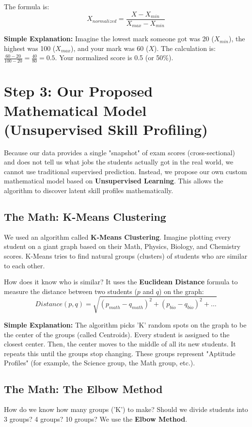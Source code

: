 \documentclass[12pt]{article}
\begin{document}
The formula is:
\begin{equation}
    X_{normalized} = \frac{X - X_{min}}{X_{max} - X_{min}}
\end{equation}

\textbf{Simple Explanation:} Imagine the lowest mark someone got was 20 ($X_{min}$), the highest was 100 ($X_{max}$), and your mark was 60 ($X$). 
The calculation is: $\frac{60 - 20}{100 - 20} = \frac{40}{80} = 0.5$. Your normalized score is 0.5 (or 50\%).

\section{Step 3: Our Proposed Mathematical Model (Unsupervised Skill Profiling)}
Because our data provides a single "snapshot" of exam scores (cross-sectional) and does not tell us what jobs the students actually got in the real world, we cannot use traditional supervised prediction. Instead, we propose our own custom mathematical model based on \textbf{Unsupervised Learning}. This allows the algorithm to discover latent skill profiles mathematically.

\subsection{The Math: K-Means Clustering}
We used an algorithm called \textbf{K-Means Clustering}. Imagine plotting every student on a giant graph based on their Math, Physics, Biology, and Chemistry scores. K-Means tries to find natural groups (clusters) of students who are similar to each other.

How does it know who is similar? It uses the \textbf{Euclidean Distance} formula to measure the distance between two students ($p$ and $q$) on the graph:
\begin{equation}
    Distance(p, q) = \sqrt{(p_{math} - q_{math})^2 + (p_{bio} - q_{bio})^2 + \dots}
\end{equation}

\textbf{Simple Explanation:} The algorithm picks 'K' random spots on the graph to be the center of the groups (called Centroids). Every student is assigned to the closest center. Then, the center moves to the middle of all its new students. It repeats this until the groups stop changing. These groups represent "Aptitude Profiles" (for example, the Science group, the Math group, etc.).

\subsection{The Math: The Elbow Method}
How do we know how many groups ('K') to make? Should we divide students into 3 groups? 4 groups? 10 groups? We use the \textbf{Elbow Method}.
\end{document}
